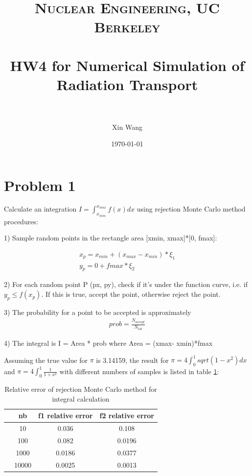 \documentclass[paper=a4, fontsize=11pt]{article} %
\title{ 
\normalfont \normalsize 
\textsc{Nuclear Engineering, UC Berkeley} \\ [25pt] %
\horrule{0.5pt} \\[0.4cm] %
\huge HW4 for Numerical Simulation of Radiation Transport\\ %
\horrule{2pt} \\[0.5cm] %
}
\author{Xin Wang} %
\date{\normalsize\today} %
\newcommand{\ra}[1]{\renewcommand{\arraystretch}{#1}}
\begin{document}
\maketitle %




\section*{Problem 1}
Calculate an integration $I = \int_{x_{min}}^{x_{max}}f(x) dx$ using rejection Monte Carlo method procedures:

1) Sample random points in the rectangle area [xmin, xmax]*[0, fmax]:

\begin{eqnarray}
x_p = x_{min} + (x_{max}-x_{min})*\xi_1 \nonumber\\
y_p = 0 + fmax * \xi_2
\end{eqnarray}

2) For each random point P (px, py), check if it's under the function curve, i.e. if $y_p \leq f(x_p)$.
If this is true, accept the point, otherwise reject the point. 

3) The probability for a point to be accepted is approximately 
\begin{eqnarray}
prob = \frac{N_{accept}}{N_{tot}}
\end{eqnarray}

4) The integral is I = Area * prob where Area = (xmax- xmin)*fmax

Assuming the true value for $\pi$ is 3.14159, the result for $\pi = 4\int_0^1 sqrt(1-x^2) dx$ and $\pi = 4\int_0^1 \frac{1}{1+x^2}$ with different numbers of samples is listed in table \ref{pb1}:

\begin{table}[h]\centering
\ra{1.3}
\begin{tabular}{@{}cccc@{}}\toprule
  & nb & f1 relative error & f2 relative error \\ \midrule
    & 10         & 0.036     &0.108 \\
    & 100        & 0.082    &0.0196 \\
    & 1000         & 0.0186 & 0.0377 \\
    & 10000        & 0.0025 & 0.0013 \\
\bottomrule
\end{tabular}
\caption{Relative error of rejection Monte Carlo method for integral calculation}
\label{pb1}
\end{table}
\end{document}
